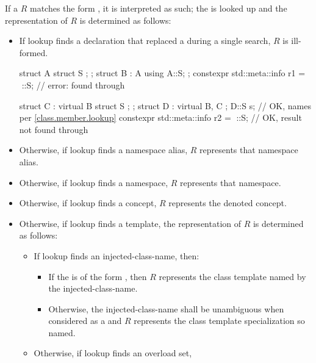 \pnum
If a  $R$ matches
the form ,
it is interpreted as such;
the  is looked up and
the representation of $R$ is determined as follows:
\begin{itemize}
\item
If lookup finds a declaration
that replaced a 
during a single search,
$R$ is ill-formed.
\begin{example}
\begin{codeblock}
struct A { struct S {}; };
struct B : A { using A::S; };
constexpr std::meta::info r1 = ^^B::S;  // error:  found through 

struct C : virtual B { struct S {}; };
struct D : virtual B, C {};
D::S s;                                 // OK, names  per \ref{class.member.lookup}
constexpr std::meta::info r2 = ^^D::S;  // OK, result  not found through 
\end{codeblock}
\end{example}
\item
Otherwise, if lookup finds a namespace alias,
$R$ represents that namespace alias.
\item
Otherwise, if lookup finds a namespace,
$R$ represents that namespace.
\item
Otherwise, if lookup finds a concept,
$R$ represents the denoted concept.
\item
Otherwise, if lookup finds a template,
the representation of $R$ is determined as follows:
\begin{itemize}
\item
If lookup finds an injected-class-name, then:
\begin{itemize}
\item
If the  is of the form
,
then $R$ represents the class template named by the injected-class-name.
\item
Otherwise, the injected-class-name shall be unambiguous
when considered as a  and
$R$ represents the class template specialization so named.
\end{itemize}
\item
Otherwise, if lookup finds an overload set,

\end{itemize}
\end{itemize}
